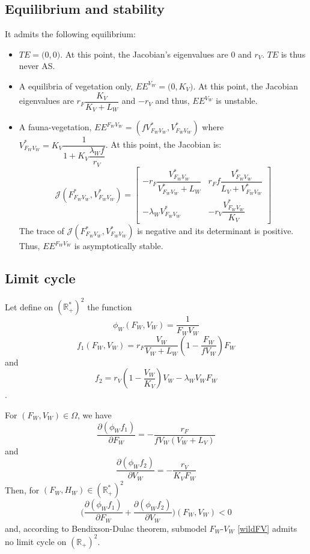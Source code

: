 \documentclass{article}
\newcommand{\lfv}{\lambda_{W}}
\begin{document}
\subsection{Equilibrium and stability}
It admits the following equilibrium:
\begin{itemize}
\item $TE = \Big(0,0 \Big)$. At this point, the Jacobian's eigenvalues are $0$ and $r_V$. $TE$ is thus never AS.
\item A equilibria of vegetation only, $EE^{V_W} = \Big(0, K_V\Big)$. At this point, the Jacobian eigenvalues are $r_F \dfrac{K_V}{K_V + L_W}$ and $-r_V$ and thus, $EE^{V_W}$ is unstable.
\item A fauna-vegetation, $EE^{F_WV_W} = \left(fV^*_{F_WV_W}, V^*_{F_WV_W} \right)$ where $V^*_{F_WV_W} = K_V \dfrac{1}{1+K_V\dfrac{\lfv f}{r_V}}$. At this point, the Jacobian is:
\begin{equation*}
\mathcal{J}(F_{F_WV_W}^*, V_{F_WV_W}^*) = \begin{bmatrix}
-r_F \dfrac{V_{F_WV_W}^*}{V_{F_WV_W}^* +L_W}  & r_F f \dfrac{V_{F_WV_W}^*}{L_V + V_{F_WV_W}^*}\\
- \lfv V_{F_WV_W}^* & -r_V \dfrac{V_{F_WV_W}^*}{K_V}
\end{bmatrix}
\end{equation*}
The trace of $\mathcal{J}(F_{F_WV_W}^*, V_{F_WV_W}^*)$ is negative and its determinant is positive. Thus, $EE^{F_WV_W}$ is asymptotically stable.
\end{itemize}

\subsection{Limit cycle}
Let define on $(\mathbb{R}^*_+)^2$ the function 
$$\phi_W(F_W, V_W) = \dfrac{1}{F_W V_W}$$
$$f_1(F_W, V_W) = r_F \dfrac{V_W}{V_W + L_W} \left(1 - \dfrac{F_W}{f V_W}\right) F_W$$
 and 
 $$f_2 = r_V \left(1 - \dfrac{V_W}{K_V}\right) V_W - \lfv V_W F_W$$.

For $(F_W, V_W) \in \Omega$, we have
\begin{equation}
\dfrac{\partial (\phi_W f_1)}{\partial F_W} = - \dfrac{r_F}{fV_W (V_W + L_V)}
\end{equation}
and
\begin{equation}
\dfrac{\partial (\phi_W f_2)}{\partial V_W} = - \dfrac{r_V}{K_V F_W}
\end{equation}
Then, for $(F_W, H_W) \in (\mathbb{R}^*_+)^2$
\begin{equation}
\Big(\dfrac{\partial (\phi_W f_1)}{\partial F_W} + \dfrac{\partial (\phi_W f_2)}{\partial V_W}\Big) (F_W, V_W) < 0
\end{equation}
and, according to Bendixson-Dulac theorem, submodel $F_W$-$V_W$ \eqref{wildFV} admits no limit cycle on $(\mathbb{R}_+)^2$.
\end{document}
